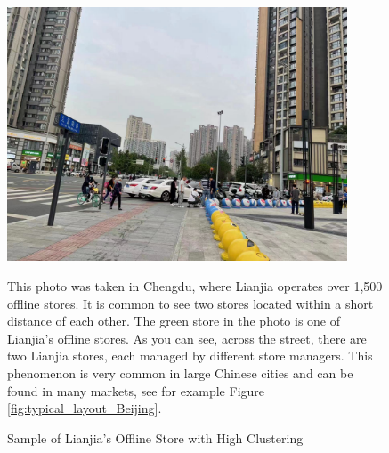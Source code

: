 \documentclass[11pt]{article}
\begin{document}
\begin{figure}[H]
  \centering
  \includegraphics[width=0.9\textwidth]{../figures/typical_sample_lianjia.pdf}
  \caption{Sample of Lianjia's Offline Store with High Clustering}
  \label{fig:typical_sample_lianjia}
  
  This photo was taken in Chengdu, where Lianjia operates over 1,500 offline stores. It is common to see two stores located within a short distance of each other. The green store in the photo is one of Lianjia's offline stores. As you can see, across the street, there are two Lianjia stores, each managed by different store managers. This phenomenon is very common in large Chinese cities and can be found in many markets, see for example Figure \ref{fig:typical_layout_Beijing}.
\end{figure}

\newpage
\end{document}
